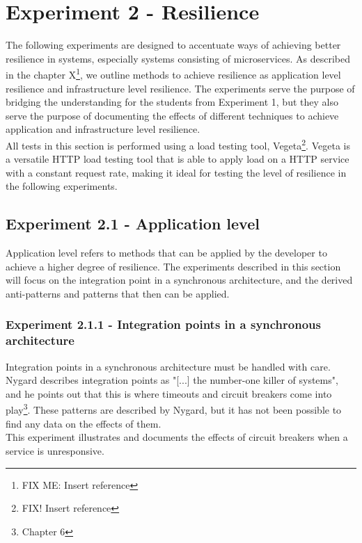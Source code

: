 \section{Experiment 2 - Resilience}
The following experiments are designed to accentuate ways of achieving better resilience in systems, especially systems consisting of microservices. As described in the chapter X\footnote{FIX ME: Insert reference}, we outline methods to achieve resilience as application level resilience and infrastructure level resilience. The experiments  serve the purpose of bridging the understanding for the students from Experiment 1, but they also serve the purpose of documenting the effects of different techniques to achieve application and infrastructure level resilience. \\
\noindent All tests in this section is performed using a load testing tool, Vegeta\footnote{FIX! Insert reference}. Vegeta is a versatile HTTP load testing tool that is able to apply load on a HTTP service with a constant request rate, making it ideal for testing the level of resilience in the following experiments.

\subsection*{Experiment 2.1 - Application level}
Application level refers to methods that can be applied by the developer to achieve a higher degree of resilience. The experiments described in this section will focus on the integration point in a synchronous architecture, and the derived anti-patterns and patterns that then can be applied.

\label{sec:experiment_application_level}
\subsubsection*{Experiment 2.1.1 - Integration points in a synchronous architecture} 
Integration points in a synchronous architecture must be handled with care. Nygard describes integration points as "[...] the number-one killer of systems"\cite[p. 46]{nygard2007release}, and he points out that this is where timeouts and circuit breakers come into play\footnote{Chapter 6}. These patterns are described by Nygard, but it has not been possible to find any data on the effects of them. \\
This experiment illustrates and documents the effects of circuit breakers when a service is unresponsive. \\

